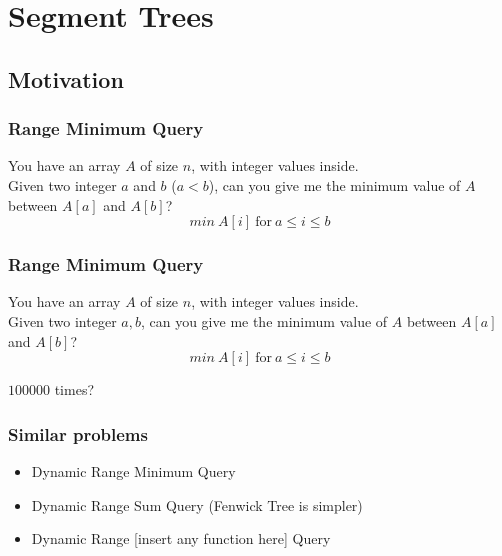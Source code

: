 \documentclass[10pt,svgnames,usenames,table]{beamer} %
\begin{document}
\section{Segment Trees}
\subsection{Motivation}
\begin{frame}
   \frametitle{Range Minimum Query}
   You have an array $A$ of size $n$, with integer values inside.\\
   Given two integer $a$ and $b$ ($a<b$), can you give me the minimum value of $A$ between $A[a]$ and $A[b]$?
   $$min\ A[i]\ \text{for}\ a \leq i \leq b$$ 
\end{frame}
\begin{frame}
   \frametitle{Range Minimum Query}
   You have an array $A$ of size $n$, with integer values inside.\\
   Given two integer $a,b$, can you give me the minimum value of $A$ between $A[a]$ and $A[b]$?
   $$min\ A[i]\ \text{for}\ a \leq i \leq b$$ 
   \begin{center}
   {\LARGE $100000$ times?}
   \end{center}
\end{frame}
\begin{frame}
  \frametitle{Similar problems}
  \begin{itemize}
    \item Dynamic Range Minimum Query
    \item Dynamic Range Sum Query (Fenwick Tree is simpler)
    \item Dynamic Range [insert any function here] Query
  \end{itemize}
\end{frame}
\end{document}
